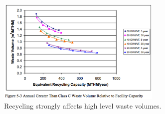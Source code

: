 \begin{figure}[htbp!]
  \begin{center}
    \includegraphics[width=0.7\textwidth]{./images/carter_volume.eps}
  \end{center}
  \caption{Recycling strongly affects high level waste volumes\cite{carter_us_2011}.}
  \label{fig:carter_volume}
\end{figure}
